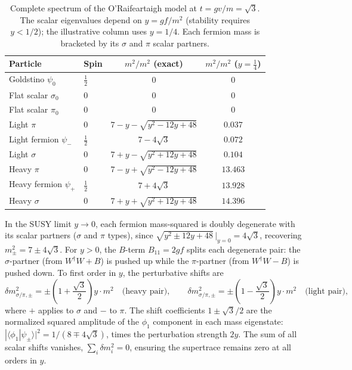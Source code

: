 \begin{table}[h]
\centering
\renewcommand{\arraystretch}{1.2}
\begin{tabular}{llcc}
\hline
Particle & Spin & $m^2/m^2$ (exact) & $m^2/m^2$ ($y = \tfrac{1}{4}$) \\
\hline
Goldstino $\psi_0$ & $\tfrac{1}{2}$ & $0$ & $0$ \\
Flat scalar $\sigma_0$ & $0$ & $0$ & $0$ \\
Flat scalar $\pi_0$ & $0$ & $0$ & $0$ \\[4pt]
Light $\pi$ & $0$ & $7-y-\sqrt{y^2-12y+48}$ & $0.037$ \\
Light fermion $\psi_-$ & $\tfrac{1}{2}$ & $7 - 4\sqrt{3}$ & $0.072$ \\
Light $\sigma$ & $0$ & $7+y-\sqrt{y^2+12y+48}$ & $0.104$ \\[4pt]
Heavy $\pi$ & $0$ & $7-y+\sqrt{y^2-12y+48}$ & $13.463$ \\
Heavy fermion $\psi_+$ & $\tfrac{1}{2}$ & $7 + 4\sqrt{3}$ & $13.928$ \\
Heavy $\sigma$ & $0$ & $7+y+\sqrt{y^2+12y+48}$ & $14.396$ \\
\hline
\end{tabular}
\caption{Complete spectrum of the O'Raifeartaigh model at $t = gv/m = \sqrt{3}$.
The scalar eigenvalues depend on $y = gf/m^2$ (stability requires $y < 1/2$);
the illustrative column uses $y = 1/4$. Each fermion mass is bracketed by
its $\sigma$ and $\pi$ scalar partners.}
\end{table}

In the SUSY limit $y \to 0$, each fermion mass-squared is doubly degenerate
with its scalar partners ($\sigma$ and $\pi$ types), since
$\sqrt{y^2 \pm 12y + 48}\,\big|_{y=0} = 4\sqrt{3}$, recovering
$m^2_\pm = 7 \pm 4\sqrt{3}$. For $y > 0$, the $B$-term $B_{11} = 2gf$
splits each degenerate pair: the $\sigma$-partner (from $W^\dagger W + B$)
is pushed up while the $\pi$-partner (from $W^\dagger W - B$) is pushed down.
To first order in $y$, the perturbative shifts are
\begin{equation}
\delta m^2_{\sigma/\pi,\pm} = \pm\left(1 + \frac{\sqrt{3}}{2}\right) y \cdot m^2
\quad \text{(heavy pair)}, \qquad
\delta m^2_{\sigma/\pi,\pm} = \pm\left(1 - \frac{\sqrt{3}}{2}\right) y \cdot m^2
\quad \text{(light pair)},
\end{equation}
where $+$ applies to $\sigma$ and $-$ to $\pi$.
The shift coefficients $1 \pm \sqrt{3}/2$ are the normalized squared amplitude
of the $\phi_1$ component in each mass eigenstate: $|\langle\phi_1|\psi_\pm\rangle|^2 = 1/(8 \mp 4\sqrt{3})$,
times the perturbation strength $2y$. The sum of all scalar shifts vanishes,
$\sum_i \delta m^2_i = 0$, ensuring the supertrace remains zero at all
orders in $y$.

